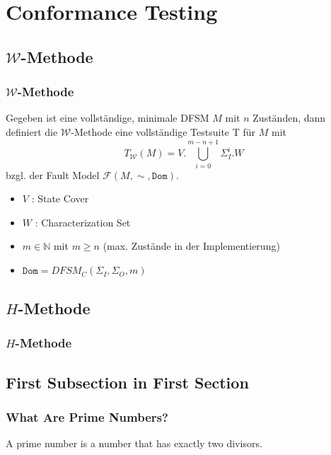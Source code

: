 \documentclass[10pt]{beamer}
\newcommand{\W}{\mathcal{W}}
\newcommand{\F}{\mathcal{F}}
\begin{document}
\section{Conformance Testing}
\subsection{$\W$-Methode}
\begin{frame}
  \frametitle{$\W$-Methode}
  \begin{definition}[$\W$-Methode]
  Gegeben ist eine vollständige, minimale DFSM $M$ mit $n$ Zuständen, dann definiert die $\W$-Methode eine vollständige Testsuite T für $M$ mit
  $$T_\W(M) = V.\bigcup\limits_{i=0}^{m-n+1}\Sigma_I^i.W$$
  bzgl. der Fault Model $\F(M, \sim, \texttt{Dom})$.
  \end{definition}
  \pause
  \begin{itemize}
    \item<2-> $V$ : State Cover
    \item<3-> $W$ : Characterization Set
    \item<4-> $m \in \mathbb{N}$ mit $m \geq n$ (max. Zustände in der Implementierung)
    \item<5-> $\texttt{Dom} = DFSM_C(\Sigma_I, \Sigma_O, m)$ 
  \end{itemize}

\end{frame}

\subsection{$H$-Methode}
\begin{frame}
  \frametitle{$H$-Methode}

\end{frame}

\subsection[Subsection 1]{First Subsection in First Section}

\begin{frame}
  \frametitle{What Are Prime Numbers?}
  \begin{definition}
  A \alert{prime number} is a number that has exactly two divisors.
  \end{definition}
\end{frame}
\end{document}
